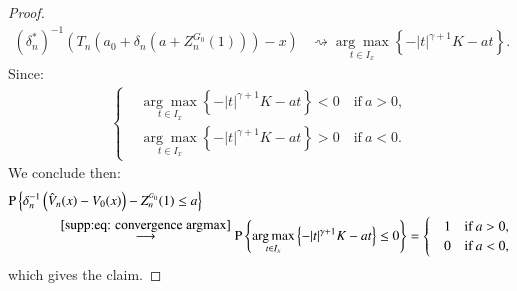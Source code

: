 \begin{proof}
		\begin{align}\label{supp:eq: convergence argmax}
			(\delta^*_n)^{-1}\left(T_n\left(a_0+\delta_n \left( a + Z^{\scriptscriptstyle{G_0}}_n(1) \right)\right)-x\right) & \rightsquigarrow \underset{t \in I_x}{\arg \max }\left\{-|t|^{\gamma + 1} K  -a t \right\}. 
			\end{align}
			Since: 
			\begin{align*}
				\begin{cases}
					&\underset{t \in I_x}{\arg \max }\left\{-|t|^{\gamma + 1}  K  -a t \right\} < 0 \quad \text{if} \: a>0, \\
					&\underset{t \in I_x}{\arg \max }\left\{-|t|^{\gamma + 1}  K  -a t \right\} >0 \quad \text{if} \: a<0.
				\end{cases}
			\end{align*}
			We conclude then:
			\begin{align*}
			\mathrm{P} &\left\{\delta_n^{-1}\left(\hat{V}_n(x)- V_0(x)\right) -Z^{\scriptscriptstyle{G_0}}_n(1) \leq a \right\}  \\
			&\quad \quad \quad  \stackrel{\eqref{supp:eq: convergence argmax}}{\longrightarrow} \mathrm{P} \left\{\underset{t \in I_x}{\arg \max }\left\{-|t|^{\gamma + 1}  K  -a t \right\} \leq 0 \right\} = \begin{cases}
				&1 \quad \text{if} \: a>0, \\
				&0 \quad \text{if} \: a<0,
			\end{cases}
			\end{align*}
			which gives the claim.
	\end{proof}
	
